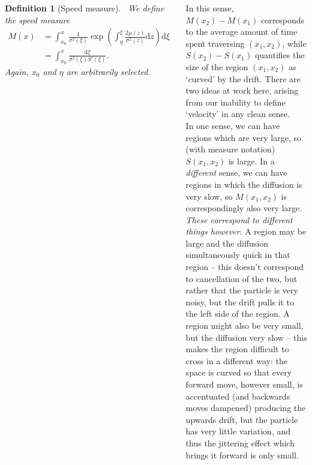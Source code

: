 \documentclass{tikzposter} %
\newtheorem{definition}{Definition}
\begin{document}
\begin{columns}
{    \begin{definition}[Speed measure]
    \ We define the speed measure
    \begin{align*}
      M(x) &= \int_{x_0}^x \frac{1}{\sigma^2(\xi)} \exp\left(\int_{\eta}^{\xi} \frac{2\mu(z)}{\sigma^2(z)} \mathrm{d} z \right) \mathrm{d}\xi \\
      &= \int_{x_0}^x \frac{\mathrm{d}\xi}{\sigma^2(\xi) S'(\xi)}.
    \end{align*}
    Again, $x_0$ and $\eta$ are arbitrarily selected.
    \end{definition}

    In this sense, $M(x_2) - M(x_1)$ corresponds to the average amount of time spent traversing $(x_1, x_2)$, while $S(x_2) - S(x_1)$ quantifies the size of the region $(x_1, x_2)$ as `curved' by the drift. There are two ideas at work here, arising from our inability to define `velocity' in any clean sense. \\

    In one sense, we can have regions which are very large, so (with measure notation) $S(x_1, x_2)$ is large. In a \emph{different} sense, we can have regions in which the diffusion is very slow, so $M(x_1, x_2)$ is correspondingly also very large. \emph{These correspond to different things however}. A region may be large and the diffusion simultaneously quick in that region -- this doesn't correspond to cancellation of the two, but rather that the particle is very noisy, but the drift pulls it to the left side of the region. A region might also be very small, but the diffusion very slow -- this makes the region difficult to cross in a different way: the space is curved so that every forward move, however small, is accentuated (and backwards moves dampened) producing the upwards drift, but the particle has very little variation, and thus the jittering effect which brings it forward is only small. \\

}
\end{columns}
\end{document}
